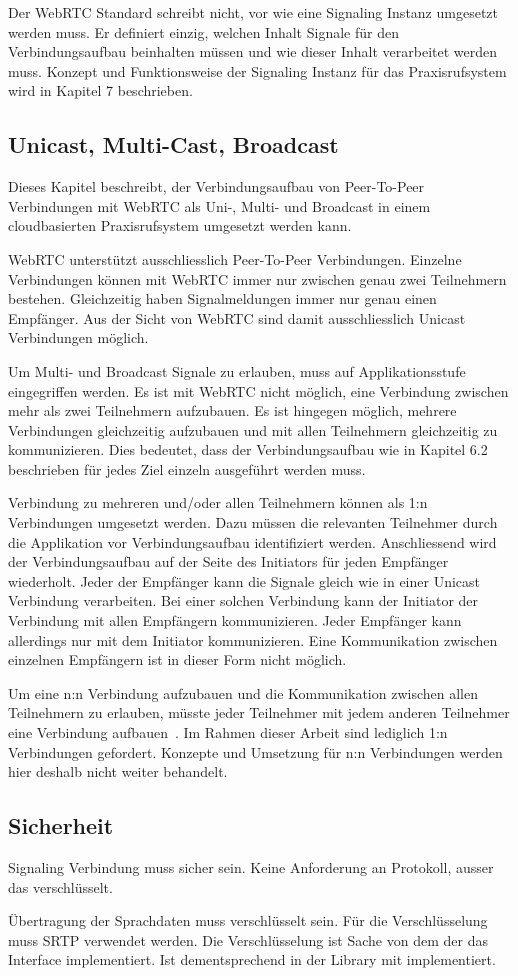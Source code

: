 Der WebRTC Standard schreibt nicht, vor wie eine Signaling Instanz umgesetzt werden muss.
Er definiert einzig, welchen Inhalt Signale für den Verbindungsaufbau beinhalten müssen und wie dieser Inhalt verarbeitet werden muss.
Konzept und Funktionsweise der Signaling Instanz für das Praxisrufsystem wird in Kapitel 7 beschrieben.

\subsection{Unicast, Multi-Cast, Broadcast}

Dieses Kapitel beschreibt, der Verbindungsaufbau von Peer-To-Peer Verbindungen mit WebRTC als Uni-, Multi- und Broadcast in einem cloudbasierten Praxisrufsystem umgesetzt werden kann.

WebRTC unterstützt ausschliesslich Peer-To-Peer Verbindungen.
Einzelne Verbindungen können mit WebRTC immer nur zwischen genau zwei Teilnehmern bestehen.
Gleichzeitig haben Signalmeldungen immer nur genau einen Empfänger.
Aus der Sicht von WebRTC sind damit ausschliesslich Unicast Verbindungen möglich.

Um Multi- und Broadcast Signale zu erlauben, muss auf Applikationsstufe eingegriffen werden.
Es ist mit WebRTC nicht möglich, eine Verbindung zwischen mehr als zwei Teilnehmern aufzubauen.
Es ist hingegen möglich, mehrere Verbindungen gleichzeitig aufzubauen und mit allen Teilnehmern gleichzeitig zu kommunizieren.
Dies bedeutet, dass der Verbindungsaufbau wie in Kapitel 6.2 beschrieben für jedes Ziel einzeln ausgeführt werden muss.

Verbindung zu mehreren und/oder allen Teilnehmern können als 1:n Verbindungen umgesetzt werden.
Dazu müssen die relevanten Teilnehmer durch die Applikation vor Verbindungsaufbau identifiziert werden.
Anschliessend wird der Verbindungsaufbau auf der Seite des Initiators für jeden Empfänger wiederholt.
Jeder der Empfänger kann die Signale gleich wie in einer Unicast Verbindung verarbeiten.
Bei einer solchen Verbindung kann der Initiator der Verbindung mit allen Empfängern kommunizieren.
Jeder Empfänger kann allerdings nur mit dem Initiator kommunizieren.
Eine Kommunikation zwischen einzelnen Empfängern ist in dieser Form nicht möglich.

Um eine n:n Verbindung aufzubauen und die Kommunikation zwischen allen Teilnehmern zu erlauben, müsste jeder Teilnehmer mit jedem anderen Teilnehmer eine Verbindung aufbauen~\cite{webrtc_mesh}.
Im Rahmen dieser Arbeit sind lediglich 1:n Verbindungen gefordert.
Konzepte und Umsetzung für n:n Verbindungen werden hier deshalb nicht weiter behandelt.


\subsection{Sicherheit}

Signaling Verbindung muss sicher sein.
Keine Anforderung an Protokoll, ausser das verschlüsselt.

Übertragung der Sprachdaten muss verschlüsselt sein.
Für die Verschlüsselung muss SRTP verwendet werden.
Die Verschlüsselung ist Sache von dem der das Interface implementiert.
Ist dementsprechend in der Library mit implementiert.


\clearpage
